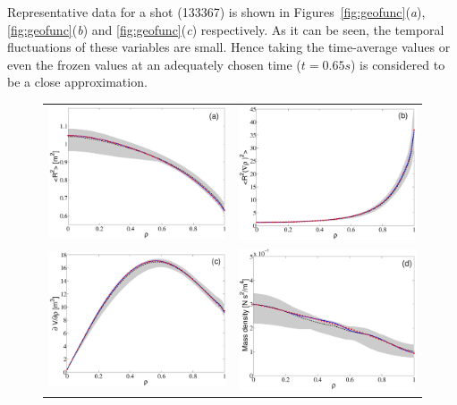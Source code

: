 \documentclass[12pt]{iopart}
\begin{document}
Representative data for a shot (133367) is shown in Figures~\ref{fig:geofunc}(\emph{a}), \ref{fig:geofunc}(\emph{b}) and \ref{fig:geofunc}(\emph{c}) respectively.  As it can be seen, the temporal fluctuations of these variables are small. Hence taking the time-average values or even the frozen values at an adequately chosen time ($t = 0.65 s$) is considered to be a close approximation. 
\begin{figure}
\begin{tabular}{cc}
\includegraphics[width=0.5\linewidth]{imene_figs/Goum1} & %
\includegraphics[width= 0.5\linewidth]{imene_figs/Goum2} \\ %
\includegraphics[width=0.5\linewidth]{imene_figs/Goum3} &%
\includegraphics[width=0.5\linewidth]{imene_figs/Goum4} %

\end{tabular}
\end{figure}
\end{document}
